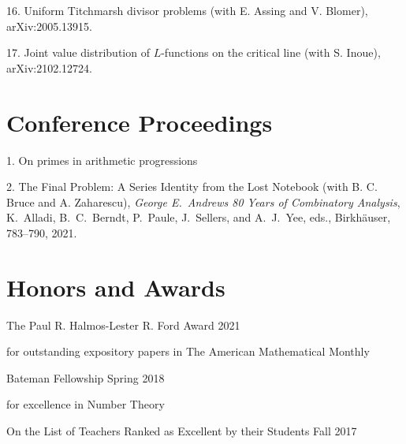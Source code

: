 \documentclass[margin,line,pifont,palatino,courier]{res}
\newenvironment{list1}{
  \begin{list}{\ding{113}}{%
      \setlength{\itemsep}{0in}
      \setlength{\parsep}{0in} \setlength{\parskip}{0in}
      \setlength{\topsep}{0in} \setlength{\partopsep}{0in}
      \setlength{\leftmargin}{0.17in}}}{\end{list}}
\begin{document}
\begin{resume}
16. {Uniform Titchmarsh divisor problems} (with E. Assing and V. Blomer), arXiv:2005.13915. 

17. {Joint value distribution of $L$-functions on the critical line} (with S. Inoue), arXiv:2102.12724.

\section{\sc Conference Proceedings}
1. {On primes in arithmetic progressions}

2. {The Final Problem: A Series Identity from the Lost Notebook} (with B. C. Bruce and A. Zaharescu),  \emph{ George E.~Andrews 80 Years of Combinatory Analysis}, K.~Alladi, B.~C.~Berndt, P.~Paule, J.~Sellers, and A.~J.~Yee, eds.,  Birkh\"{a}user, 783--790, 2021.


\section{\sc Honors and Awards}

{The Paul R. Halmos-Lester R. Ford Award}   \hfill{2021}

\begin{list1}
\item[]	for outstanding expository papers in The American Mathematical Monthly
\end{list1}

{Bateman Fellowship }  \hfill{Spring 2018}

\begin{list1}
	\item[]	for excellence in Number Theory
\end{list1}

{On the List of Teachers Ranked as Excellent by their Students} \hfill{Fall 2017}


%
%
%
%
%
%
%



\end{resume}
\end{document}
